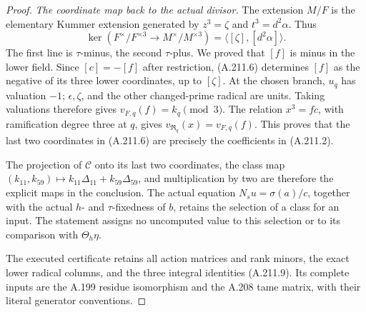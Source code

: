 \begin{proof}
\emph{The coordinate map back to the actual divisor.}
The extension \(M/F\) is the elementary Kummer extension generated
by \(z^3=\zeta\) and \(t^3=d^2\alpha\).  Thus
\[
 \ker(F^\times/F^{\times3}\to M^\times/M^{\times3})
              =\langle[\zeta],[d^2\alpha]\rangle.
\tag{A.211.18}
\]
The first line is \(\tau\)-minus, the second \(\tau\)-plus.
We proved that \([f]\) is minus in the lower field.  Since
\([c]=-[f]\) after restriction, (A.211.6) determines \([f]\)
as the negative of its three lower coordinates, up to \([\zeta]\).
At the chosen branch, \(u_q\) has valuation \(-1\);
\(\epsilon,\zeta\), and the other changed-prime radical are units.
Taking valuations therefore gives \(v_{F,q}(f)=k_q\pmod3\).
The relation \(x^3=fc\), with ramification degree three at \(q\),
gives \(v_{\mathfrak R_q}(x)=v_{F,q}(f)\).
This proves that the last two coordinates in (A.211.6) are
precisely the coefficients in (A.211.2).

The projection of \(\mathcal C\) onto its last two coordinates,
the class map \((k_{11},k_{59})\mapsto
k_{11}\Delta_{11}+k_{59}\Delta_{59}\), and multiplication by two
are therefore the explicit maps in the conclusion.
The actual equation \(N_su=\sigma(a)/c\), together with the actual
\(h\)- and \(\tau\)-fixedness of \(b\), retains the selection of a
class for an input.  The statement assigns no uncomputed value
to this selection or to its comparison with \(\Theta_h\eta\).

The executed certificate
retains all action matrices and rank minors, the exact lower
radical columns, and the three integral identities (A.211.9).
Its complete inputs are the A.199 residue isomorphism and the
A.208 tame matrix, with their literal generator conventions.
\end{proof}
